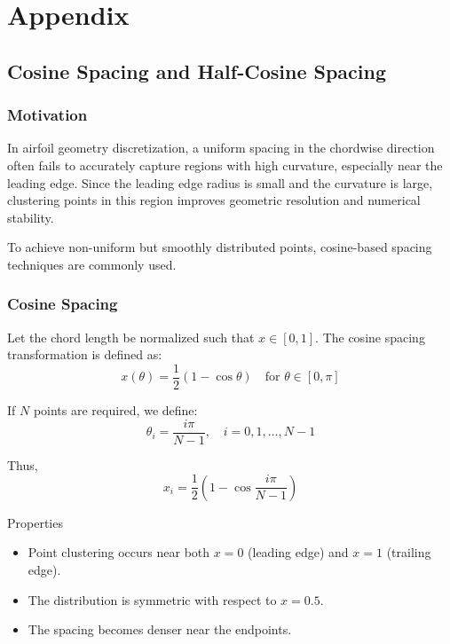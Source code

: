 \appendix
\section*{Appendix}


\subsection*{Cosine Spacing and Half-Cosine Spacing}


\subsubsection*{Motivation}

In airfoil geometry discretization, 
a uniform spacing in the chordwise direction often fails to accurately capture regions with high curvature, especially near the leading edge. 
Since the leading edge radius is small and the curvature is large, 
clustering points in this region improves geometric resolution and numerical stability.

To achieve non-uniform but smoothly distributed points, 
cosine-based spacing techniques are commonly used.


\subsubsection*{Cosine Spacing}

Let the chord length be normalized such that $x \in [0,1]$.  
The cosine spacing transformation is defined as:
\[
x(\theta) = \frac{1}{2}\left(1 - \cos \theta \right)
\quad \text{for } \theta \in [0,\pi]
\]

If $N$ points are required, we define:
\[
\theta_i = \frac{i\pi}{N-1}, \quad i = 0,1,\dots,N-1
\]

Thus,
\[
x_i = \frac{1}{2}\left(1 - \cos \frac{i\pi}{N-1} \right)
\]

Properties

\begin{itemize}
    \item Point clustering occurs near both $x=0$ (leading edge) and $x=1$ (trailing edge).
    \item The distribution is symmetric with respect to $x=0.5$.
    \item The spacing becomes denser near the endpoints.
\end{itemize}

